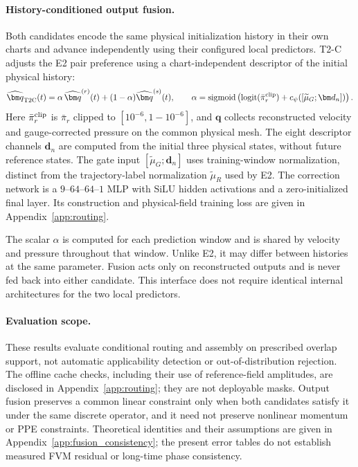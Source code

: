 \paragraph{History-conditioned output fusion.}
Both candidates encode the same physical initialization history in
their own charts and advance independently using their configured
local predictors. T2-C adjusts the E2 pair preference using a
chart-independent descriptor of the initial physical history:
\begin{equation}
  \widehat{\bm q}_{\rm T2C}(t)
  =\alpha\,\widehat{\bm q}^{(r)}(t)
   +(1-\alpha)\widehat{\bm q}^{(s)}(t),\qquad
  \alpha=\operatorname{sigmoid}
  \left(\operatorname{logit}(\bar\pi_r^{\rm clip})
       +c_\psi([\widetilde\mu_G;\bm d_n])\right).
  \label{eq:main_t2c}
\end{equation}
Here $\bar\pi_r^{\rm clip}$ is $\bar\pi_r$ clipped to
$[10^{-6},1-10^{-6}]$, and $\bm q$ collects reconstructed velocity
and gauge-corrected pressure on the common physical mesh.
The eight descriptor channels $\bm d_n$ are computed from the initial
three physical states, without future reference states.
The gate input $[\widetilde\mu_G;\bm d_n]$ uses training-window
normalization, distinct from the trajectory-label normalization
$\widetilde\mu_R$ used by E2. The correction network is a
$9$--$64$--$64$--$1$ MLP with SiLU hidden activations and a
zero-initialized final layer. Its construction and physical-field
training loss are given in Appendix~\ref{app:routing}.

The scalar $\alpha$ is computed for each prediction window and is
shared by velocity and pressure throughout that window.
Unlike E2, it may differ between histories at the same parameter.
Fusion acts only on reconstructed outputs and is never fed back
into either candidate. This interface does not require identical
internal architectures for the two local predictors.

\paragraph{Evaluation scope.}
These results evaluate conditional routing and assembly on prescribed
overlap support, not automatic applicability detection or
out-of-distribution rejection. The offline cache checks, including
their use of reference-field amplitudes, are disclosed in
Appendix~\ref{app:routing}; they are not deployable masks.
Output fusion preserves a common linear constraint only when both
candidates satisfy it under the same discrete operator, and it need
not preserve nonlinear momentum or PPE constraints.
Theoretical identities and their assumptions are given in
Appendix~\ref{app:fusion_consistency}; the present error tables do not
establish measured FVM residual or long-time phase consistency.

